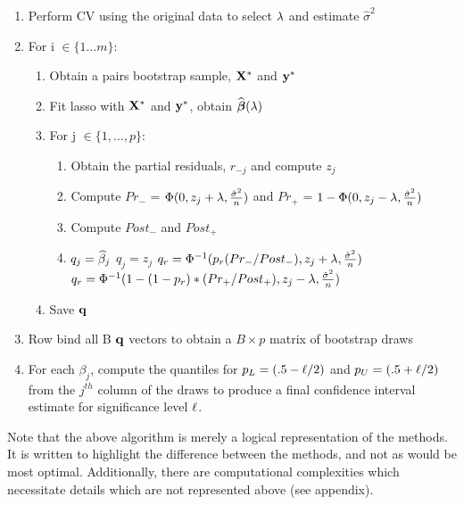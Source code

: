 \begin{enumerate}
\item Perform CV using the original data to select $\lambda$ and estimate $\hat{\sigma}^2$
\item For i $\in \lbrace 1 \ldots m \rbrace$:
\begin{enumerate}
\item Obtain a pairs bootstrap sample, $\mathbf{X}^*$ and $\mathbf{y}^*$
\item Fit lasso with $\mathbf{X}^*$ and $\mathbf{y}^*$, obtain $\widehat{\boldsymbol{\beta}}(\lambda)$
\item For j $\in \lbrace 1, \ldots, p \rbrace$:
	\begin{enumerate}
	\item Obtain the partial residuals, $r_{-j}$ and compute $z_j$
	\item Compute $Pr_{-}$ = $\Phi(0, z_j + \lambda, \frac{\hat{\sigma}^2}{n})$ and $Pr_{+}$ = $1 - \Phi(0, z_j - \lambda, \frac{\hat{\sigma}^2}{n})$
	\item Compute $Post_-$ and $Post_+$
	\item
	\begin{algorithmic}
    \State $q_j = \widehat{\beta}_j$
	  \State $q_j = z_j$
	  \State
  		\State $q_r = \Phi^{-1}(p_r(Pr_{-} / Post_{-}), z_j + \lambda, \frac{\hat{\sigma}^2}{n})$
  	\Else
  	   \State $q_r = \Phi^{-1}(1 - (1 - p_r)*(Pr_{+} / Post_{+}), z_j - \lambda, \frac{\hat{\sigma}^2}{n})$
		\EndIf
	\EndIf
	\end{algorithmic}
	\end{enumerate}
\item Save $\mathbf{q}$
\end{enumerate}
\item Row bind all B $\mathbf{q}$ vectors to obtain a $B \times p$ matrix of bootstrap draws
\item For each $\beta_j$, compute the quantiles for $p_L = (.5 - \ell/2)$ and $p_U = (.5 + \ell/2)$ from the $j^{th}$ column of the draws to produce a final confidence interval estimate for significance level $\ell$.
\end{enumerate}

Note that the above algorithm is merely a logical representation of the methods. It is written to highlight the difference between the methods, and not as would be most optimal. Additionally, there are computational complexities which necessitate details which are not represented above (see appendix).

